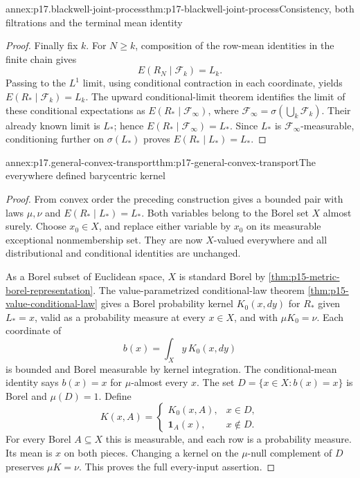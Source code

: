 \begin{annexitem}{annex:p17.blackwell-joint-process}{thm:p17-blackwell-joint-process}{Consistency, both filtrations and the terminal mean identity}
\begin{proof}
Finally fix \(k\). For \(N\geq k\), composition of the row-mean
identities in the finite chain gives
\[
                           E(R_N\mid\mathcal F_k)=L_k.
\]
Passing to the \(L^1\) limit, using conditional contraction in each
coordinate, yields \(E(R_*\mid\mathcal F_k)=L_k\).
The upward conditional-limit theorem identifies the limit of these
conditional expectations as
\(E(R_*\mid\mathcal F_\infty)\), where
\(\mathcal F_\infty=\sigma(\bigcup_k\mathcal F_k)\).
Their already known limit is \(L_*\); hence
\(E(R_*\mid\mathcal F_\infty)=L_*\).
Since \(L_*\) is \(\mathcal F_\infty\)-measurable, conditioning further
on \(\sigma(L_*)\) proves \(E(R_*\mid L_*)=L_*\).
\end{proof}
\end{annexitem}

\begin{annexitem}{annex:p17.general-convex-transport}{thm:p17-general-convex-transport}{The everywhere defined barycentric kernel}
\begin{proof}
From convex order the preceding construction gives a bounded pair
with laws \(\mu,\nu\) and \(E(R_*\mid L_*)=L_*\).
Both variables belong to the Borel set \(X\) almost surely.
Choose \(x_0\in X\), and replace either variable by \(x_0\) on its
measurable exceptional nonmembership set.
They are now \(X\)-valued everywhere and all distributional and
conditional identities are unchanged.

As a Borel subset of Euclidean space, \(X\) is standard Borel by
\cref{thm:p15-metric-borel-representation}.
The value-parametrized conditional-law theorem
\cref{thm:p15-value-conditional-law} gives a Borel probability kernel
\(K_0(x,dy)\) for \(R_*\) given \(L_*=x\), valid as a probability
measure at every \(x\in X\), and with \(\mu K_0=\nu\).
Each coordinate of
\[
                              b(x)=\int_Xy\,K_0(x,dy)
\]
is bounded and Borel measurable by kernel integration.
The conditional-mean identity says \(b(x)=x\) for \(\mu\)-almost
every \(x\). The set \(D=\{x\in X:b(x)=x\}\) is Borel and
\(\mu(D)=1\). Define
\[
 K(x,A)=
 \begin{cases}
 K_0(x,A),&x\in D,\\
 \mathbf1_A(x),&x\notin D.
 \end{cases}
\]
For every Borel \(A\subseteq X\) this is measurable, and each row
is a probability measure. Its mean is \(x\) on both pieces.
Changing a kernel on the \(\mu\)-null complement of \(D\) preserves
\(\mu K=\nu\). This proves the full every-input assertion.


\end{proof}
\end{annexitem}
